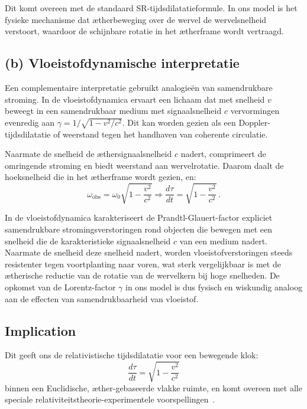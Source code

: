 Dit komt overeen met de standaard SR-tijdsdilatatieformule. In ons model is het fysieke mechanisme dat ætherbeweging over de wervel de wervelsnelheid verstoort, waardoor de schijnbare rotatie in het ætherframe wordt vertraagd.

\subsection*{(b) Vloeistofdynamische interpretatie}

Een complementaire interpretatie gebruikt analogieën van samendrukbare stroming. In de vloeistofdynamica ervaart een lichaam dat met snelheid $v$ beweegt in een samendrukbaar medium met signaalsnelheid $c$ vervormingen evenredig aan $\gamma = 1/\sqrt{1 - v^2/c^2}$. Dit kan worden gezien als een Doppler-tijdsdilatatie of weerstand tegen het handhaven van coherente circulatie.

Naarmate de snelheid de æthersignaalsnelheid $c$ nadert, comprimeert de omringende stroming en biedt weerstand aan wervelrotatie. Daarom daalt de hoeksnelheid die in het ætherframe wordt gezien, en:
\[
    \omega_{\text{obs}} = \omega_0 \sqrt{1 - \frac{v^2}{c^2}} \Rightarrow \frac{d\tau}{dt} = \sqrt{1 - \frac{v^2}{c^2}} \,. \tag{3}
\]

In de vloeistofdynamica karakteriseert de Prandtl-Glauert-factor expliciet samendrukbare stromingsverstoringen rond objecten die bewegen met een snelheid die de karakteristieke signaalsnelheid $c$ van een medium nadert. Naarmate de snelheid deze snelheid nadert, worden vloeistofverstoringen steeds resistenter tegen voortplanting naar voren, wat sterk vergelijkbaar is met de ætherische reductie van de rotatie van de wervelkern bij hoge snelheden. De opkomst van de Lorentz-factor $\gamma$ in ons model is dus fysisch en wiskundig analoog aan de effecten van samendrukbaarheid van vloeistof.

\subsection*{Implication}

Dit geeft ons de relativistische tijdsdilatatie voor een bewegende klok:
\[
    \boxed{\frac{d\tau}{dt} = \sqrt{1 - \frac{v^2}{c^2}}}
\]
binnen een Euclidische, æther-gebaseerde vlakke ruimte, en komt overeen met alle speciale relativiteitstheorie-experimentele voorspellingen~\cite{Rado2020-aether-Lorentz,Levy2009-aether-clock}.